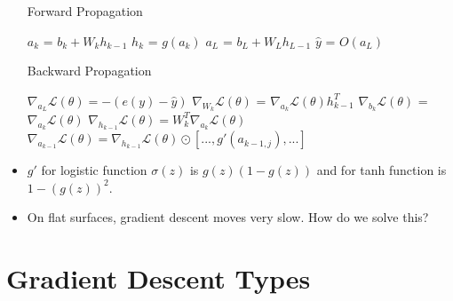 \documentclass[a4paper]{article}
\begin{document}
\begin{itemize}
    \begin{algorithm}[H]
        \caption{Forward Propagation}\label{alg:DL-forward-pass}
        \begin{algorithmic}[1]
                \State $a_k$ = $b_k+W_kh_{k-1}$
                \State $h_k$ = $g(a_k)$
            \EndFor
            \State $a_L$ = $b_L+W_Lh_{L-1}$
            \State $\hat{y}$ = $O(a_L)$
        \end{algorithmic}
    \end{algorithm}
    \begin{algorithm}[H]
        \caption{Backward Propagation}\label{alg:DL-backward-pass}
        \begin{algorithmic}[1]
            \State $\nabla_{a_L}\mathcal{L}(\theta)=-(e(y)-\hat{y})$
                \State $\nabla_{W_k}\mathcal{L}(\theta)$ = $\nabla_{a_k}\mathcal{L}(\theta)h_{k-1}^T$
                \State $\nabla_{b_k}\mathcal{L}(\theta)$ = $\nabla_{a_k}\mathcal{L}(\theta)$
                \State $\nabla_{h_{k-1}}\mathcal{L}(\theta)=W_k^T\nabla_{a_k}\mathcal{L}(\theta)$
                \State $\nabla_{a_{k-1}}\mathcal{L}(\theta)=\nabla_{h_{k-1}}\mathcal{L}(\theta)\odot [...,g'(a_{k-1,j}),...]$
            \EndFor
        \end{algorithmic}
    \end{algorithm}
    \item $g'$ for logistic function $\sigma(z)$ is $g(z)(1-g(z))$ and for tanh function is $1-(g(z))^2$.
    \item On flat surfaces, gradient descent moves very slow. How do we solve this?
\end{itemize}

\section{Gradient Descent Types}
\end{document}
